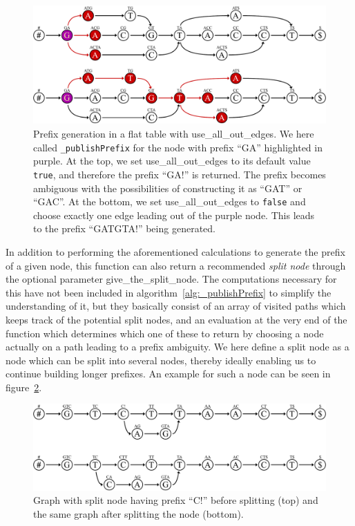 \documentclass[a4paper,12pt,twoside,BCOR=10mm]{scrbook}
\begin{document}
\begin{figure}[!htb]
\centering
\includegraphics[width=\textwidth]{evo_fig_use_all_out_edges_or_not.pdf}
\caption[Prefix generation in a flat table with use\_all\_out\_edges]{Prefix generation in a flat table with \textup{use\_all\_out\_edges}. We here called \textup{\texttt{\_publishPrefix}} for the node with prefix \textup{“GA”} highlighted in purple. At the top, we set \textup{use\_all\_out\_edges} to its default value \textup{\texttt{true}}, and therefore the prefix \textup{“GA!”} is returned. The prefix becomes ambiguous with the possibilities of constructing it as \textup{“GAT”} or \textup{“GAC”}. At the bottom, we set \textup{use\_all\_out\_edges} to \textup{\texttt{false}} and choose exactly one edge leading out of the purple node. This leads to the prefix \textup{“GATGTA!”} being generated.} \label{fig:evo_fig_use_all_out_edges_or_not}
\end{figure}
In addition to performing the aforementioned calculations to generate the prefix of a given node,
this function can also return a recommended \textit{split node} through the optional parameter give\_the\_split\_node.
The computations necessary for this have not been included in algorithm~\ref{alg:_publishPrefix} to simplify
the understanding of it, but they basically consist of an array of visited paths which keeps track
of the potential split nodes, and an evaluation at the very end of the function which determines
which one of these to return by choosing a node actually on a path leading to a prefix ambiguity.
We here define a split node as a node which can be split into several nodes, thereby ideally enabling us
to continue building longer prefixes.
An example for such a node can be seen in figure~\ref{fig:evo_split_node}.
\begin{figure}[!htb]
\centering
\includegraphics[width=\textwidth]{evo_split_node.pdf}
\caption[Graph with split node before and after splitting]{Graph with split node having prefix \textup{“C!”} before splitting (top) and the same graph after splitting the node (bottom).} \label{fig:evo_split_node}
\end{figure}
\end{document}
